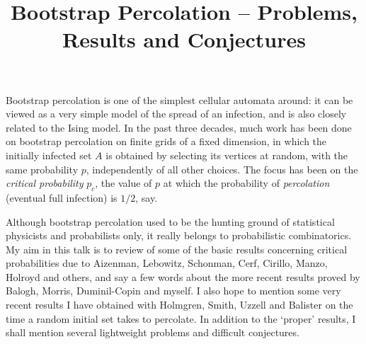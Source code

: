 \title{Bootstrap Percolation -- Problems, Results and Conjectures}
\endtitle

Bootstrap percolation is one of the simplest cellular automata around:
it can be viewed as a very simple model of the spread of an infection,
and is also closely related to the Ising model. In the past three decades,
much work has been done on bootstrap percolation on finite grids of a
fixed dimension, in which the initially infected set $A$ is obtained
by selecting its vertices at random, with the same probability $p$,
independently of all other choices. The focus has been on the {\em critical
probability} $p_c$, the value of $p$ at which the probability of {\em percolation}
(eventual full infection)  is $1/2$, say.

\vspace{10pt}
\noindent
Although bootstrap percolation used to be the hunting ground of statistical
physicists and probabilists only, it really belongs to probabilistic combinatorics.
My aim in this talk is to review of some of the basic results concerning
critical probabilities due to Aizenman, Lebowitz, Schonman, Cerf, Cirillo,
Manzo, Holroyd and others, and say a few words about the more recent results
proved by Balogh, Morris, Duminil-Copin and myself. I also hope to mention
some very recent results I have obtained with Holmgren, Smith, Uzzell and Balister
on the time a random initial set takes to percolate. In addition to the `proper'
results, I shall mention several lightweight problems and difficult conjectures.